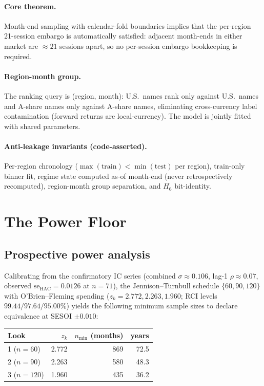 \documentclass[11pt,a4paper]{article}
\begin{document}
\paragraph{Core theorem.} Month-end sampling with calendar-fold boundaries implies
that the per-region 21-session embargo is automatically satisfied: adjacent month-ends
in either market are $\approx 21$ sessions apart, so no per-session embargo bookkeeping
is required.

\paragraph{Region-month group.} The ranking query is (region, month): U.S.\ names
rank only against U.S.\ names and A-share names only against A-share names, eliminating
cross-currency label contamination (forward returns are local-currency). The model is
jointly fitted with shared parameters.

\paragraph{Anti-leakage invariants (code-asserted).} Per-region chronology
($\max(\text{train}) < \min(\text{test})$ per region), train-only binner fit,
regime state computed as-of month-end (never retrospectively recomputed),
region-month group separation, and $H_6$ bit-identity.

\section{The Power Floor}\label{sec:powerfloor}

\subsection{Prospective power analysis}

Calibrating from the confirmatory IC series (combined $\sigma\!\approx\!0.106$,
lag-1 $\rho\!\approx\!0.07$, observed $\text{se}_\text{HAC}=0.0126$ at $n=71$), the
Jennison--Turnbull schedule $\{60, 90, 120\}$ with O'Brien--Fleming spending
($z_k = 2.772, 2.263, 1.960$; RCI levels $99.44/97.64/95.00\%$) yields the following
minimum sample sizes to declare equivalence at SESOI $\pm 0.010$:

\begin{center}
\begin{tabular}{lrrr}
\toprule
Look & $z_k$ & $n_{\min}$ (months) & years \\
\midrule
1 ($n=60$) & 2.772 & 869 & 72.5 \\
2 ($n=90$) & 2.263 & 580 & 48.3 \\
3 ($n=120$) & 1.960 & 435 & 36.2 \\
\bottomrule
\end{tabular}
\end{center}
\end{document}
